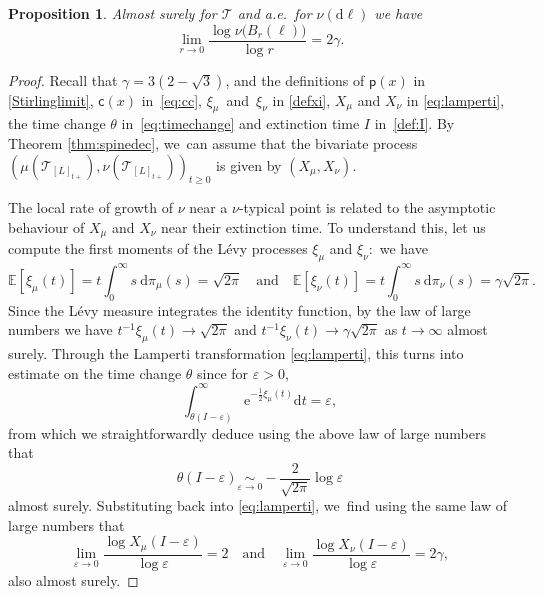 \documentclass[11pt]{article}
\let\dH\gamma
\newcommand{\pp}{\mathsf{p}}
\newcommand{\cc}{\mathsf{c}}\let\ff\cc
\newcommand{\T}{\mathcal{T}}\let\CRT\T\let\tbr\T
\let\veps\varepsilon
\newtheorem{prop}[thm]{Proposition}
\theoremstyle{definition}
\begin{document}
\begin{prop}\label{prop:continuous Hausdorff} Almost surely for $\mathcal{T}$ and a.e.\ for $\nu(\mathrm{d}\ell)$ we have
\[
\lim_{r \to 0} \frac{\log \nu \big(B_r(\ell)\big) }{\log r} = 2 \dH.
\]
\end{prop}

\begin{proof}
Recall that $\gamma=3(2-\sqrt{3})$, and the definitions of $\pp(x)$ in \eqref{Stirlinglimit}, $\cc(x)$ in~\eqref{eq:cc}, $\xi_\mu$~and~$\xi_\nu$ in \eqref{defxi}, $X_\mu$ and $X_\nu$ in \eqref{eq:lamperti}, the time change $\theta$ in~\eqref{eq:timechange} and extinction time $I$ in~\eqref{def:I}. By Theorem \ref{thm:spinedec}, we~can assume that the bivariate process $(\mu(\T_{[L]_{t+}}),\nu(\T_{[L]_{t+}}))_{t\geq 0}$ is given by $(X_\mu,X_\nu)$.

The local rate of growth of $\nu$ near a $\nu$-typical point is related to the asymptotic behaviour of $X_\mu$ and $X_\nu$ near their extinction time. To understand this, let us compute the first moments of the Lévy processes $\xi_\mu$ and $\xi_\nu:$ we have
\[
\mathbb{E}[\xi_\mu(t)] = t \int_0^{\infty} s\ \mathrm{d}\pi_\mu(s) = \sqrt{2 \pi} \quad \text{and}\quad \mathbb{E}[\xi_\nu(t)] = t \int_0^{\infty} s\ \mathrm{d}\pi_\nu(s) = \dH \sqrt{2\pi}.
\]
Since the Lévy measure integrates the identity function, by the law of large numbers we have $t^{-1}\xi_\mu (t) \to \sqrt{2 \pi}$ and $t^{-1}\xi_\nu (t) \to \dH \sqrt{2\pi}$ as $t \to \infty$ almost surely. Through the Lamperti transformation \eqref{eq:lamperti}, this turns into estimate on the time change $\theta$ since for $\veps>0$,
\[
\int_{\theta(I-\veps)}^{\infty} \mathrm{e}^{-\frac12 \xi_\mu(t)}\mathrm dt=\veps,
\]
from which we straightforwardly deduce using the above law of large numbers that
\[
\theta(I-\veps)\underset{\veps\to 0}\sim-\frac2{\sqrt{2\pi}}\log \veps
\]
almost surely. Substituting back into \eqref{eq:lamperti}, we~find using the same law of large numbers that
\[
\lim_{ \varepsilon \to 0}\frac{\log X_\mu(I - \varepsilon)}{\log \varepsilon} =2\quad \text{and} \quad \lim_{ \varepsilon \to 0}\frac{\log X_\nu(I - \varepsilon)}{\log \varepsilon} = 2\dH,
\]
also almost surely.


\end{proof}
\end{document}
